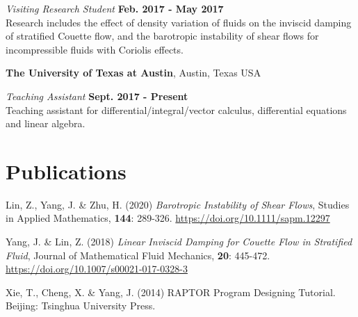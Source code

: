 \documentclass[margin,line]{res}
\begin{document}
\begin{resume}

{\em Visiting Research Student} \hfill {\bf Feb. 2017 - May 2017}\\
Research includes the effect of density variation of fluids on the inviscid damping of stratified Couette flow, and the barotropic instability of shear flows for incompressible fluids with Coriolis effects.

{\bf The University of Texas at Austin}, Austin, Texas USA

{\em Teaching Assistant} \hfill {\bf Sept. 2017 - Present}\\
Teaching assistant for differential/integral/vector calculus, differential equations and linear algebra.


\section{\sc Publications}

\begin{etaremune}[leftmargin=0.02in, start=3]
    \item Lin, Z., Yang, J. \& Zhu, H. (2020) \textit{Barotropic Instability of Shear Flows}, Studies in Applied Mathematics, \textbf{144}: 289-326. 
    \href{https://doi.org/10.1111/sapm.12297}{https://doi.org/10.1111/sapm.12297} 
    \item Yang, J. \& Lin, Z. (2018) \textit{Linear Inviscid Damping for Couette Flow in Stratified Fluid}, Journal of Mathematical Fluid Mechanics, \textbf{20}: 445-472. \href{https://doi.org/10.1007/s00021-017-0328-3}{https://doi.org/10.1007/s00021-017-0328-3}
    \item Xie, T., Cheng, X. \& Yang, J. (2014) RAPTOR Program Designing Tutorial. Beijing: Tsinghua University Press.
\end{etaremune}


\end{resume}
\end{document}
